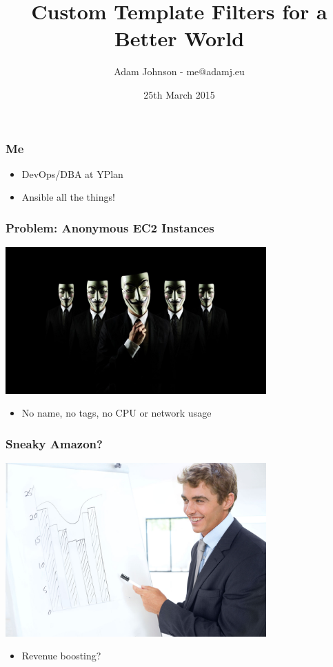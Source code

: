 \documentclass{beamer}
\title{Custom Template Filters for a Better World}
\author{Adam Johnson - me@adamj.eu}
\date{25th March 2015}
\begin{document}
\maketitle


\begin{frame}\frametitle{Me}

    \begin{itemize}
        \item DevOps/DBA at YPlan
        \item Ansible all the things!
    \end{itemize}

\end{frame}


\begin{frame}\frametitle{Problem: Anonymous EC2 Instances}

    \begin{center}
        \includegraphics[width=10cm]{anonymous}
    \end{center}

    \begin{itemize}
        \item No name, no tags, no CPU or network usage
    \end{itemize}

\end{frame}


\begin{frame}\frametitle{Sneaky Amazon?}

    \begin{center}
        \includegraphics[width=10cm]{look-i-made-a-graph}
    \end{center}

    \begin{itemize}
        \item Revenue boosting?
    \end{itemize}

\end{frame}
\end{document}
